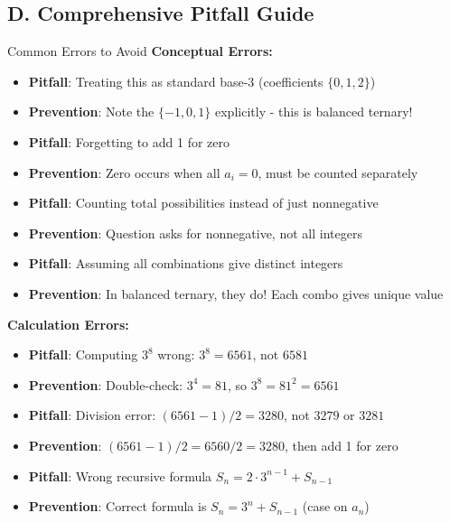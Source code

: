 \documentclass[12pt]{article}
\begin{document}
\begin{roadmapbox}
\subsection*{D. Comprehensive Pitfall Guide}

\begin{highlightbox}{Common Errors to Avoid}
\textbf{Conceptual Errors:}
\begin{itemize}
    \item \textbf{Pitfall}: Treating this as standard base-3 (coefficients $\{0,1,2\}$)
    \item \textbf{Prevention}: Note the $\{-1,0,1\}$ explicitly - this is balanced ternary!
    
    \item \textbf{Pitfall}: Forgetting to add 1 for zero
    \item \textbf{Prevention}: Zero occurs when all $a_i = 0$, must be counted separately
    
    \item \textbf{Pitfall}: Counting total possibilities instead of just nonnegative
    \item \textbf{Prevention}: Question asks for nonnegative, not all integers
    
    \item \textbf{Pitfall}: Assuming all combinations give distinct integers
    \item \textbf{Prevention}: In balanced ternary, they do! Each combo gives unique value
\end{itemize}

\textbf{Calculation Errors:}
\begin{itemize}
    \item \textbf{Pitfall}: Computing $3^8$ wrong: $3^8 = 6561$, not $6581$
    \item \textbf{Prevention}: Double-check: $3^4 = 81$, so $3^8 = 81^2 = 6561$
    
    \item \textbf{Pitfall}: Division error: $(6561-1)/2 = 3280$, not $3279$ or $3281$
    \item \textbf{Prevention}: $(6561-1)/2 = 6560/2 = 3280$, then add 1 for zero
    
    \item \textbf{Pitfall}: Wrong recursive formula $S_n = 2 \cdot 3^{n-1} + S_{n-1}$
    \item \textbf{Prevention}: Correct formula is $S_n = 3^n + S_{n-1}$ (case on $a_n$)
\end{itemize}


\end{highlightbox}
\end{roadmapbox}
\end{document}
